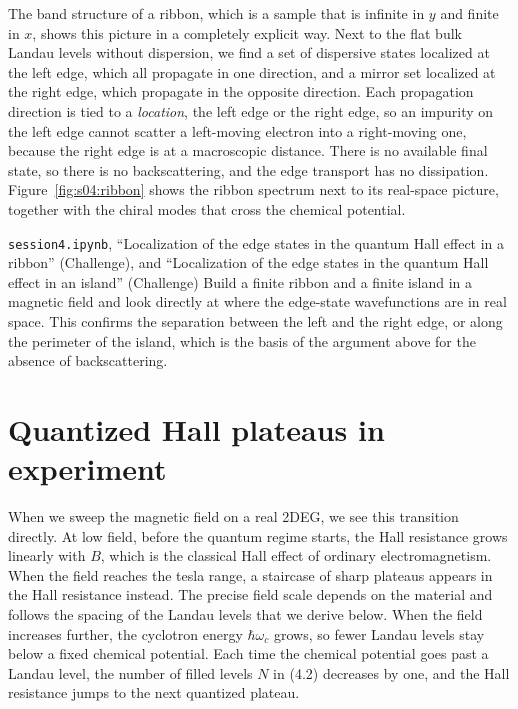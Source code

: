 The band structure of a ribbon, which is a sample that is infinite in $y$ and finite in $x$, shows
this picture in a completely explicit way. Next to the flat bulk Landau levels without dispersion,
we find a set of dispersive states localized at the left edge, which all propagate in one
direction, and a mirror set localized at the right edge, which propagate in the opposite direction.
Each propagation direction is tied to a \emph{location}, the left edge or the right edge, so an
impurity on the left edge cannot scatter a left-moving electron into a right-moving one, because
the right edge is at a macroscopic distance. There is no available final state, so there is no
backscattering, and the edge transport has no dissipation. Figure~\ref{fig:s04:ribbon} shows the
ribbon spectrum next to its real-space picture, together with the chiral modes that cross the
chemical potential.



\begin{notebookbox}{\texttt{session4.ipynb}, ``Localization of the edge states in the quantum Hall effect in a ribbon'' (Challenge), and ``Localization of the edge states in the quantum Hall effect in an island'' (Challenge)}
Build a finite ribbon and a finite island in a magnetic field and look directly at where the
edge-state wavefunctions are in real space. This confirms the separation between the left and the
right edge, or along the perimeter of the island, which is the basis of the argument above for the
absence of backscattering.
\end{notebookbox}

\section{Quantized Hall plateaus in experiment}

When we sweep the magnetic field on a real 2DEG, we see this transition directly. At low field,
before the quantum regime starts, the Hall resistance grows linearly with $B$, which is the
classical Hall effect of ordinary electromagnetism. When the field reaches the tesla range, a
staircase of sharp plateaus appears in the Hall resistance instead. The precise field scale
depends on the material and follows the spacing of the Landau levels that we derive below. When
the field increases further, the cyclotron energy $\hbar\omega_c$ grows, so fewer Landau levels
stay below a fixed chemical potential. Each time the chemical potential goes past a Landau level,
the number of filled levels $N$ in (4.2) decreases by one, and the Hall resistance jumps to the
next quantized plateau.

